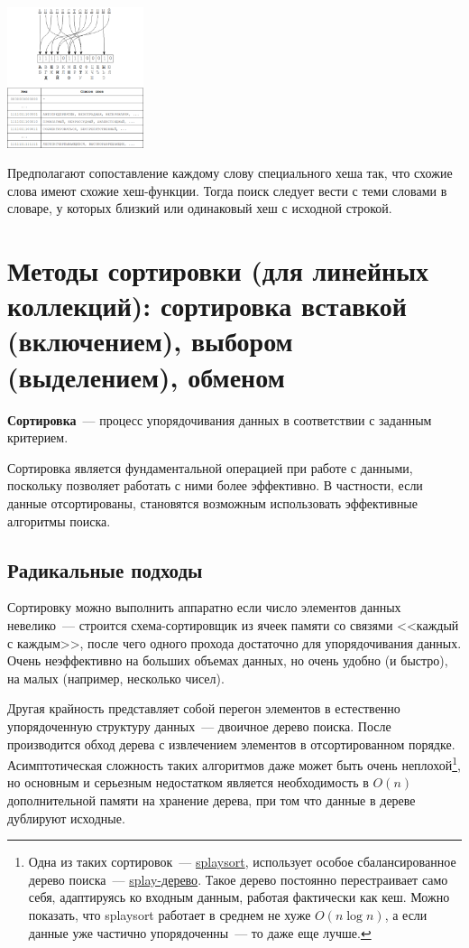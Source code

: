 \begin{center}
  \includegraphics[width=0.3\textwidth]{resources/19-26/hash.png}
\end{center}
Предполагают сопоставление каждому слову специального хеша так, что схожие слова имеют схожие хеш-функции. Тогда поиск следует вести с
теми словами в словаре, у которых близкий или одинаковый хеш с исходной строкой.


\section{Методы сортировки (для линейных коллекций): сортировка вставкой (включением), выбором (выделением), обменом}
\textbf{Сортировка}~--- процесс упорядочивания данных в соответствии с заданным критерием.

Сортировка является фундаментальной операцией при работе с данными, поскольку позволяет работать с ними более
эффективно. В частности, если данные отсортированы, становятся возможным использовать эффективные алгоритмы поиска.

\subsection{Радикальные подходы}
Сортировку можно выполнить аппаратно если число элементов данных невелико~--- строится схема-сортировщик из ячеек памяти
со связями <<каждый с каждым>>, после чего одного прохода достаточно для упорядочивания данных. Очень
неэффективно на больших объемах данных, но очень удобно (и быстро), на малых (например, несколько чисел).

Другая крайность представляет собой перегон элементов в естественно упорядоченную структуру данных~--- двоичное дерево поиска.
После производится обход дерева с извлечением элементов в отсортированном порядке.
Асимптотическая сложность таких алгоритмов даже может быть очень неплохой\footnote{
  Одна из таких сортировок~--- \href{https://en.wikipedia.org/wiki/Splaysort}{splaysort}, использует особое
  сбалансированное дерево поиска~--- \href{https://en.wikipedia.org/wiki/Splay_tree}{splay-дерево}. Такое дерево постоянно перестраивает
  само себя, адаптируясь ко входным данным, работая фактически как кеш. Можно показать, что splaysort работает в среднем не хуже
  \(O(n\log{n})\), а если данные уже частично упорядоченны~--- то даже еще лучше.
}, но основным и серьезным недостатком является
необходимость в \(O(n)\) дополнительной памяти на хранение дерева, при том что данные в дереве дублируют исходные.

